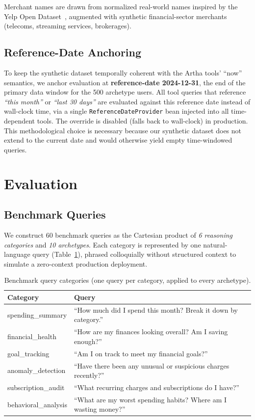 \documentclass[conference]{IEEEtran}
\begin{document}
Merchant names are drawn from normalized real-world names inspired
by the Yelp Open Dataset~\cite{yelp_open}, augmented with
synthetic financial-sector merchants (telecoms, streaming services,
brokerages).

\subsection{Reference-Date Anchoring}

To keep the synthetic dataset temporally coherent with the Artha
tools' ``now'' semantics, we anchor evaluation at
\textbf{reference-date 2024-12-31}, the end of the primary data
window for the 500 archetype users. All tool queries that reference
\emph{``this month''} or \emph{``last 30 days''} are evaluated
against this reference date instead of wall-clock time, via a
single \texttt{ReferenceDateProvider} bean injected into all
time-dependent tools. The override is disabled (falls back to
wall-clock) in production. This methodological choice is necessary
because our synthetic dataset does not extend to the current date
and would otherwise yield empty time-windowed queries.

\section{Evaluation}

\subsection{Benchmark Queries}

We construct 60 benchmark queries as the Cartesian product of
\emph{6 reasoning categories} and \emph{10 archetypes}. Each
category is represented by one natural-language query
(Table~\ref{tab:queries}), phrased colloquially without structured
context to simulate a zero-context production deployment.

\begin{table}[t]
\centering
\caption{Benchmark query categories (one query per category,
applied to every archetype).}
\label{tab:queries}
\begin{tabular}{@{}lp{5.1cm}@{}}
\toprule
Category & Query \\
\midrule
spending\_summary & ``How much did I spend this month? Break it
down by category.'' \\
financial\_health & ``How are my finances looking overall? Am I
saving enough?'' \\
goal\_tracking & ``Am I on track to meet my financial goals?'' \\
anomaly\_detection & ``Have there been any unusual or suspicious
charges recently?'' \\
subscription\_audit & ``What recurring charges and subscriptions
do I have?'' \\
behavioral\_analysis & ``What are my worst spending habits? Where
am I wasting money?'' \\
\bottomrule
\end{tabular}
\end{table}
\end{document}
